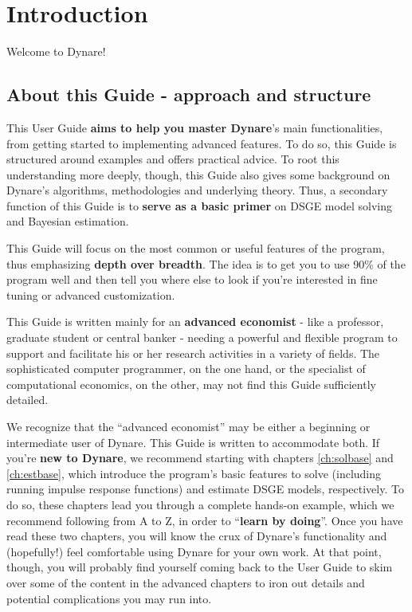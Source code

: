 \documentclass[10pt,math=newtx,citestyle=gb7714-2015,bibstyle=gb7714-2015]{elegantbook}
\begin{document}
	\tableofcontents
	
	\mainmatter
	
	\chapter{Introduction}
	
	Welcome to Dynare! 
	
	\section{About this Guide - approach and structure}
	This User Guide \textbf{aims to help you master Dynare}'s main functionalities, from getting started to implementing advanced features. To do so, this Guide is structured around examples and offers practical advice. To root this understanding more deeply, though, this Guide also gives some background on Dynare's algorithms, methodologies and underlying theory. Thus, a secondary function of this Guide is to \textbf{serve as a basic primer} on DSGE model solving and Bayesian estimation. 
	
	This Guide will focus on the most common or useful features of the program, thus emphasizing \textbf{depth over breadth}. The idea is to get you to use 90\% of the program well and then tell you where else to look if you're interested in fine tuning or advanced customization.
	
	This Guide is written mainly for an \textbf{advanced economist} - like a professor, graduate student or central banker - needing a powerful and flexible program to support and facilitate his or her research activities in a variety of fields. The sophisticated computer programmer, on the one hand, or the specialist of computational economics, on the other, may not find this Guide sufficiently detailed. 
	
	We recognize that the ``advanced economist'' may be either a beginning or intermediate user of Dynare. This Guide is written to accommodate both. If you're \textbf{new to Dynare}, we recommend starting with chapters \ref{ch:solbase} and \ref{ch:estbase}, which introduce the program's basic features to solve (including running impulse response functions) and estimate DSGE models, respectively. To do so, these chapters lead you through a complete hands-on example, which we recommend following from A to Z, in order to ``\textbf{learn by doing}''. Once you have read these two chapters, you will know the crux of Dynare's functionality and (hopefully!) feel comfortable using Dynare for your own work. At that point, though, you will probably find yourself coming back to the User Guide to skim over some of the content in the advanced chapters to iron out details and potential complications you may run into.
	
\end{document}
